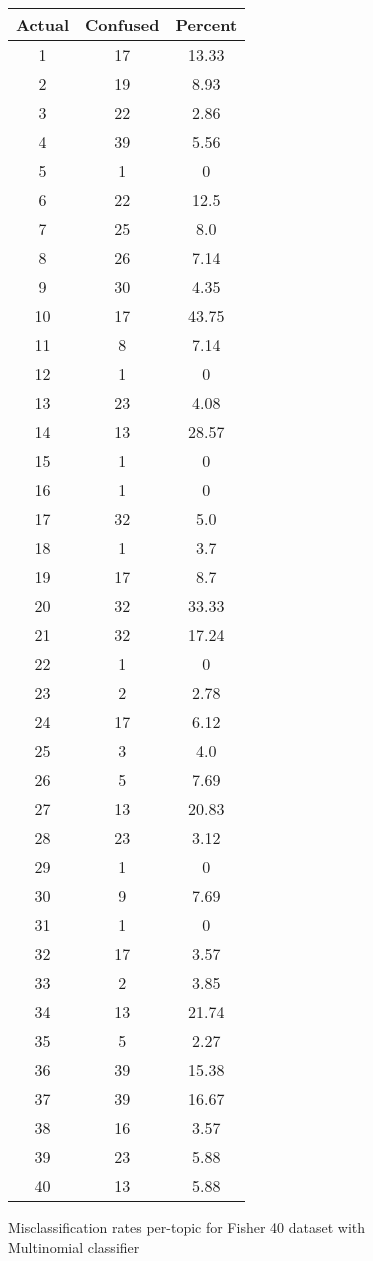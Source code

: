 \documentclass[10pt,a4paper]{article}
\begin{document}
\begin{figure}[H]
\centering
\begin{tabular}{|c|c|c|}
\hline
Actual & Confused & Percent \\
\hline
1 & 17 & 13.33\\
2 & 19 & 8.93\\
3 & 22 & 2.86\\
4 & 39 & 5.56\\
5 & 1 & 0\\
6 & 22 & 12.5\\
7 & 25 & 8.0\\
8 & 26 & 7.14\\
9 & 30 & 4.35\\
10 & 17 & 43.75\\
11 & 8 & 7.14\\
12 & 1 & 0\\
13 & 23 & 4.08\\
14 & 13 & 28.57\\
15 & 1 & 0\\
16 & 1 & 0\\
17 & 32 & 5.0\\
18 & 1 & 3.7\\
19 & 17 & 8.7\\
20 & 32 & 33.33\\
21 & 32 & 17.24\\
22 & 1 & 0\\
23 & 2 & 2.78\\
24 & 17 & 6.12\\
25 & 3 & 4.0\\
26 & 5 & 7.69\\
27 & 13 & 20.83\\
28 & 23 & 3.12\\
29 & 1 & 0\\
30 & 9 & 7.69\\
31 & 1 & 0\\
32 & 17 & 3.57\\
33 & 2 & 3.85\\
34 & 13 & 21.74\\
35 & 5 & 2.27\\
36 & 39 & 15.38\\
37 & 39 & 16.67\\
38 & 16 & 3.57\\
39 & 23 & 5.88\\
40 & 13 & 5.88\\   
\hline
\end{tabular}
\caption{Misclassification rates per-topic for Fisher 40 dataset with Multinomial classifier}
\end{figure}
\end{document}
